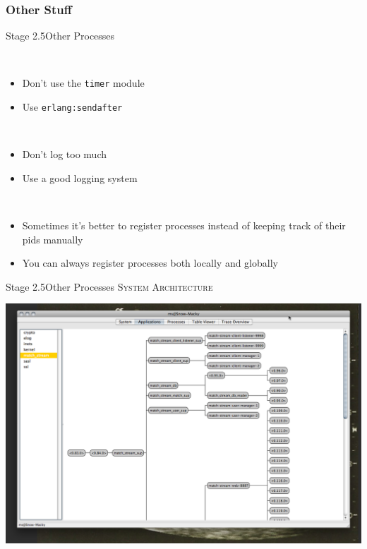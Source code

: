 \documentclass[utf8]{beamer}
\begin{document}
\subsubsection{Other Stuff}
\begin{frame}{Stage 2.5}{Other Processes}
	\begin{description}
		\item<+->[Timers]\ \\
			\begin{itemize}
				\item Don't use the \texttt{timer} module
				\item Use \texttt{erlang:send\textunderscore after}
			\end{itemize}
		\item<+->[Logging]\ \\
			\begin{itemize}
				\item Don't log too much
				\item Use a good logging system
			\end{itemize}
		\item<+->[Registration]\ \\
			\begin{itemize}
				\item Sometimes it's better to register processes instead of keeping track of their pids manually
				\item You can always register processes \alert{both} locally and globally
			\end{itemize}
	\end{description}
\end{frame}
\begin{frame}{Stage 2.5}{Other Processes}
	\textsc{System Architecture}
	\begin{center}
		\includegraphics[height=.75\textheight]{img/running-late.png}
	\end{center}
\end{frame}
\end{document}
